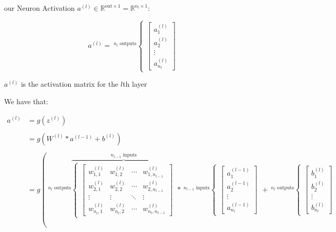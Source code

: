 \documentclass[
]{book}
\begin{document}
our Neuron Activation \(a^{(l)} \in \mathbb{R}^{\text{out} \times 1} = \mathbb{R}^{n_l \times 1}\):

\[
a^{(l)} = \ ^{n_l\text{ outputs}}
  \begin{cases}
    \begin{bmatrix}
      a^{(l)}_{1} \\
      a^{(l)}_{2} \\
      \vdots \\
      a^{(l)}_{n_l}
    \end{bmatrix}
  \end{cases}
\]

\(a^{(l)}\) is the activation matrix for the \(l\)th layer

We have that:

\[
\begin{aligned}
a^{(l)} &= g\left(z^{(l)}\right) \\ \\
&= g\left(W^{(l)} * a^{(l - 1)} + b^{(l)}\right) \\ \\
&= g\left(\ ^{n_l\text{ outputs}}
\overbrace{
  \begin{cases}
    \begin{bmatrix}
    w^{(l)}_{1, 1} & w^{(l)}_{1, 2} & \cdots & w^{(l)}_{1, n_{l-1}} \\
    w^{(l)}_{2, 1} & w^{(l)}_{2, 2} & \cdots & w^{(l)}_{2, n_{l-1}} \\
    \vdots & \vdots & \ddots & \vdots \\
    w^{(l)}_{n_l, 1} & w^{(l)}_{n_l, 2} & \cdots & w^{(l)}_{n_l, n_{l-1}}
    \end{bmatrix}
  \end{cases} 
}^{n_{l - 1} \text{ inputs}} * \ ^{n_{l - 1} \text{ inputs}}
  \begin{cases}
    \begin{bmatrix}
      a^{(l-1)}_{1} \\
      a^{(l-1)}_{2} \\
      \vdots \\
      a^{(l-1)}_{n_l}
    \end{bmatrix}
  \end{cases} + \ ^{n_l\text{ outputs}}
  \begin{cases}
    \begin{bmatrix}
    b^{(l)}_{1} \\
    b^{(l)}_{2} \\
    \vdots \\
    b^{(l)}_{n_l}
    \end{bmatrix}

\end{cases}
\end{aligned}\]
\end{document}
